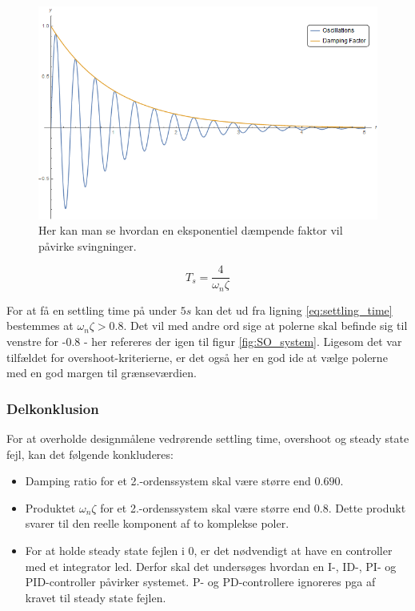 \begin{figure}[ht]
	\begin{center}
		\includegraphics[scale=0.45]{Billeder/Damped_Oscillations.png}
	\end{center}
\caption{Her kan man se hvordan en eksponentiel dæmpende faktor vil påvirke svingninger.}
\label{fig:Damped_Oscillations}
\end{figure}

\begin{equation}\label{eq:settling_time}
T_{s}=\frac{4}{\omega_{n}\zeta}
\end{equation}

For at få en settling time på under $5s$ kan det ud fra ligning \eqref{eq:settling_time} bestemmes at $\omega_{n}\zeta > 0.8$. Det vil med andre ord sige at polerne skal befinde sig til venstre for -0.8 - her refereres der igen til figur \ref{fig:SO_system}. Ligesom det var tilfældet for overshoot-kriterierne, er det også her en god ide at vælge polerne med en god margen til grænseværdien.

\subsubsection{Delkonklusion}

For at overholde designmålene vedrørende settling time, overshoot og steady state fejl, kan det følgende konkluderes:

\begin{itemize}[noitemsep]
\item Damping ratio for et 2.-ordenssystem skal være større end $0.690$.
\item Produktet $\omega_{n}\zeta$ for et 2.-ordenssystem skal være større end $0.8$. Dette produkt svarer til den reelle komponent af to komplekse poler.
\item For at holde steady state fejlen i 0, er det nødvendigt at have en controller med et integrator led. Derfor skal det undersøges hvordan en I-, ID-, PI- og PID-controller påvirker systemet. P- og PD-controllere ignoreres pga af kravet til steady state fejlen.
\end{itemize}

